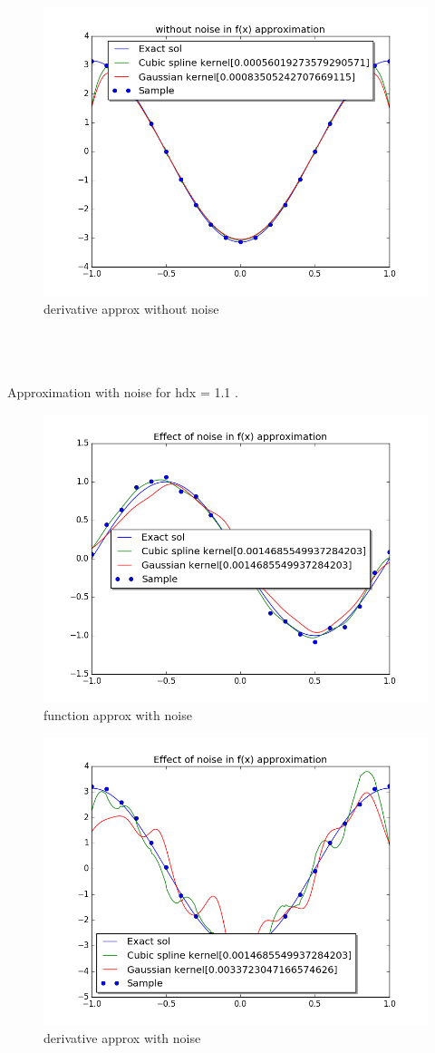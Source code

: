 \documentclass[a4paper,11pt]{article}
\begin{document}
\begin{figure}[ht]
    \centering
    \includegraphics[width=.8\linewidth]{ndnoise.png}
    \caption{derivative approx without noise}
    \label{fig:ex12}    
\end{figure}
\newpage
\indent\\
\newpage
\indent\\
\newpage
\indent\\
\indent Approximation with noise for hdx = 1.1 .
\begin{figure}[ht]
    \centering
    \includegraphics[width=.8\linewidth]{noise.png}
    \caption{function approx with noise}
    \label{fig:ex13}    
\end{figure}

\begin{figure}[ht]
    \centering
    \includegraphics[width=.8\linewidth]{dnoise.png}
    \caption{derivative approx with noise}
    \label{fig:ex14}    
\end{figure}
\end{document}
